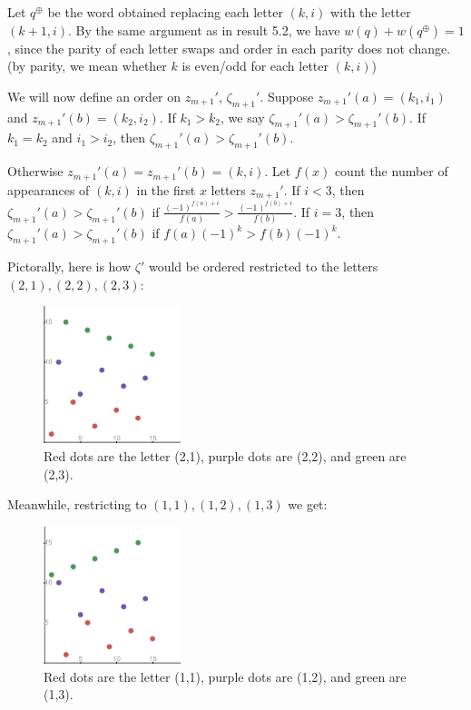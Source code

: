 \documentclass{article}
\begin{document}
Let $q^\oplus$ be the word obtained replacing each letter $(k,i)$ with the letter $(k+1,i)$. By the same argument as in result 5.2, we have $w(q)+w(q^\oplus) = 1$, since the parity of each letter swaps and order in each parity does not change. (by parity, we mean whether $k$ is even/odd for each letter $(k,i)$)

We will now define an order on $z_{m+1}'$, $\zeta_{m+1}'$. Suppose $z_{m+1}'(a) = (k_1,i_1)$ and $z_{m+1}'(b) = (k_2,i_2)$. If $k_1 > k_2$, we say $\zeta_{m+1}'(a) > \zeta_{m+1}'(b)$. If $k_1 = k_2$ and $i_1 > i_2$, then $\zeta_{m+1}'(a) > \zeta_{m+1}'(b)$. 

Otherwise $z_{m+1}'(a) = z_{m+1}'(b) = (k,i)$. Let $f(x)$ count the number of appearances of $(k,i)$ in the first $x$ letters $z_{m+1}'$. If $i <3$, then $\zeta_{m+1}'(a) > \zeta_{m+1}'(b)$ if $\frac{(-1)^{f(a)+i}}{f(a)} > \frac{(-1)^{f(b)+i}}{f(b)}  $. If $i = 3$, then $\zeta_{m+1}'(a) > \zeta_{m+1}'(b)$ if $f(a)(-1)^k > f(b)(-1)^k$.

Pictorally, here is how $\zeta'$ would be ordered restricted to the letters $(2,1),(2,2),(2,3)$:


\begin{figure}[htp]
    \centering
    \includegraphics[width=4cm]{desmos-graph}
    \caption{Red dots are the letter (2,1), purple dots are (2,2), and green are (2,3).}
\end{figure}

Meanwhile, restricting to $(1,1),(1,2),(1,3)$ we get:

\begin{figure}[htp]
    \centering
    \includegraphics[width=4cm]{desmos-graph (1)}
    \caption{Red dots are the letter (1,1), purple dots are (1,2), and green are (1,3).}
\end{figure}
\end{document}
